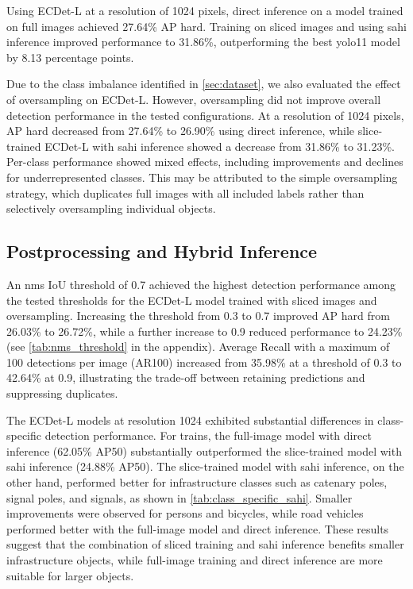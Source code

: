 Using ECDet-L at a resolution of 1024 pixels, direct inference on a model trained on full images achieved 27.64\% AP hard. Training on sliced images and using \acrshort{sahi} inference improved performance to 31.86\%, outperforming the best \acrshort{yolo}11 model by 8.13 percentage points.

Due to the class imbalance identified in \cref{sec:dataset}, we also evaluated the effect of oversampling on ECDet-L. However, oversampling did not improve overall detection performance in the tested configurations. At a resolution of 1024 pixels, AP hard decreased from 27.64\% to 26.90\% using direct inference, while slice-trained ECDet-L with \acrshort{sahi} inference showed a decrease from 31.86\% to 31.23\%. Per-class performance showed mixed effects, including improvements and declines for underrepresented classes. This may be attributed to the simple oversampling strategy, which duplicates full images with all included labels rather than selectively oversampling individual objects.

\subsection{Postprocessing and Hybrid Inference}
An \acrshort{nms} IoU threshold of 0.7 achieved the highest detection performance among the tested thresholds for the ECDet-L model trained with sliced images and oversampling. Increasing the threshold from 0.3 to 0.7 improved AP hard from 26.03\% to 26.72\%, while a further increase to 0.9 reduced performance to 24.23\% (see \cref{tab:nms_threshold} in the appendix). 
Average Recall with a maximum of 100 detections per image (AR100)  increased from 35.98\% at a threshold of 0.3 to 42.64\% at 0.9, illustrating the trade-off between retaining predictions and suppressing duplicates.

The ECDet-L models at resolution 1024 exhibited substantial differences in class-specific detection performance. For trains, the full-image model with direct inference (62.05\% AP50) substantially outperformed the slice-trained model with \acrshort{sahi} inference (24.88\% AP50). The slice-trained model with \acrshort{sahi} inference, on the other hand, performed better for infrastructure classes such as catenary poles, signal poles, and signals, as shown in \cref{tab:class_specific_sahi}. Smaller improvements were observed for persons and bicycles, while road vehicles performed better with the full-image model and direct inference. These results suggest that the combination of sliced training and \acrshort{sahi} inference benefits smaller infrastructure objects, while full-image training and direct inference are more suitable for larger objects.


